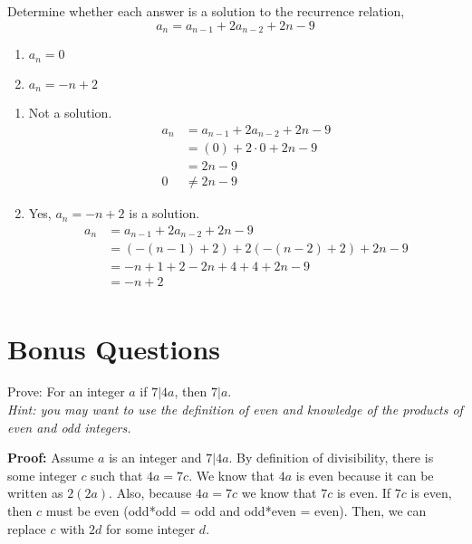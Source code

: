 \begin{questions}
 Determine whether each answer is a solution to the recurrence relation, 
$$ a_n = a_{n-1} + 2a_{n-2} + 2n - 9 $$
    \begin{enumerate}[label=(\alph*),topsep=0pt,itemsep=0pt,parsep=0pt]
        \item $a_n = 0$
        \item $a_n = -n +2$
    \end{enumerate}
    \ifprintanswers
        \vspace{-10pt}
    \fi
\begin{solution}
    \begin{enumerate}[label=(\alph*),topsep=0pt,itemsep=0pt,parsep=0pt]
        \item Not a solution.
        \begin{align*}
            a_n &= a_{n-1} + 2a_{n-2} + 2n - 9 \\
            &= (0) + 2\cdot0 + 2n - 9 \\
            &= 2n - 9 \\
            0 &\neq 2n - 9
        \end{align*}
        \item Yes, $a_n = -n + 2$ is a solution.
        \begin{align*}
            a_n &= a_{n-1} + 2a_{n-2} + 2n - 9 \\
            &= (-(n-1) + 2) + 2(-(n-2) + 2) + 2n -9 \\
            &= -n + 1 + 2 -2n + 4 + 4 + 2n -9 \\
            &= -n +2 \\
        \end{align*}
    \end{enumerate}
\end{solution}


\section*{Bonus Questions} 




\bonusquestion[6] Prove: For an integer $a$ if $7 | 4a$, then $7 | a$. \\
\textit{Hint: you may want to use the definition of even and knowledge of the products of even and odd integers.}
 \ifprintanswers
        \vspace{-10pt}
    \fi
  \begin{solution} 
  \textbf{Proof:}  Assume $a$ is an integer and $7 | 4a$.  By definition of divisibility, there is some integer $c$ such that $4a = 7c$.  We know that $4a$ is even because it can be written as $2(2a)$.  Also, because $4a = 7c$ we know that $7c$ is even.  If $7c$ is even, then $c$ must be even (odd*odd = odd and odd*even = even).  Then, we can replace $c$ with $2d$ for some integer $d$.  


\end{solution}
\end{questions}
